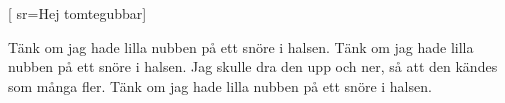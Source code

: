
[ 					
	sr={Hej tomtegubbar}]	
	
\beginverse*						
Tänk om jag hade lilla nubben på ett snöre i halsen.
Tänk om jag hade lilla nubben på ett snöre i halsen.
Jag skulle dra den upp och ner,
så att den kändes som många fler.
Tänk om jag hade lilla nubben på ett snöre i halsen.
\endverse						

\vspace{5mm}	
\endsong		
		